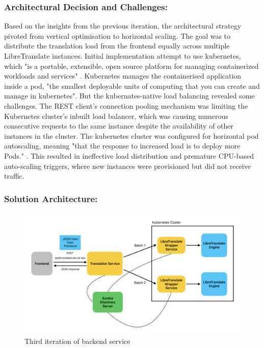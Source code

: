 \subsubsection{Architectural Decision and Challenges:} Based on the insights from the previous iteration, the architectural strategy pivoted from vertical optimisation to horizontal scaling. The goal was to distribute the translation load from the frontend equally across multiple LibreTranslate instances. Initial implementation attempt to use kubernetes, which "is a portable, extensible, open source platform for managing containerized workloads and services" \cite{kubernetes_overview}\cite{burns2022kubernetes}. Kubernetes manages the containerised application inside a pod, "the smallest deployable units of computing that you can create and manage in kubernetes"\cite{kubernetes_pods}. But the kubernates-native load balancing revealed some challenges. The REST client's connection pooling mechanism was limiting the Kubernetes cluster's inbuilt load balancer\cite{kubernetes_services_networking}\cite{redhat_kubernetes_cluster}, which was causing numerous consecutive requests to the same instance despite the availability of other instances in the cluster\cite{expedia_load_distribution}\cite{pubsapient_uneven_distribution}. 
The kubernetes cluster was configured for horizontal pod autoscaling, meaning "that the response to increased load is to deploy more Pods." \cite{kubernetes_horizontal_pod_autoscaling}.
This resulted in ineffective load distribution and premature CPU-based auto-scaling triggers, where new instances were provisioned but did not receive traffic.

\subsubsection{Solution Architecture:}
\begin{figure}[H]
    \centering
    \includegraphics[width=1\linewidth]{chapter/05_implementation/backend/B_architectural_design/Backend_Iteration_3.pdf}
    \caption{Third iteration of backend service}
    \label{fig:backend_iteration_3}
\end{figure}

